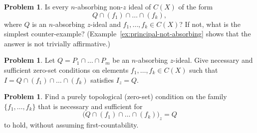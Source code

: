 \documentclass[11pt]{amsart}
\theoremstyle{definition}
\newtheorem{problem}[theorem]{Problem}
\theoremstyle{remark}
\begin{document}
\begin{problem}
\label{prob:classify-gap}
Is every $n$-absorbing non-$z$ ideal of $C(X)$ of the form
\[
Q\cap(f_1)\cap\dots\cap(f_k),
\]
where $Q$ is an $n$-absorbing $z$-ideal and $f_1,\dots,f_k\in C(X)$?
If not, what is the simplest counter-example? (Example~\ref{ex:principal-not-absorbing}
shows that the answer is not trivially affirmative.)
\end{problem}

\begin{problem}
\label{prob:exact-generators}
Let $Q=P_1\cap\dots\cap P_m$ be an $n$-absorbing $z$-ideal. Give
necessary and sufficient zero-set conditions on elements
$f_1,\dots,f_k\in C(X)$ such that
$I=Q\cap(f_1)\cap\dots\cap(f_k)$ satisfies $I_z=Q$.
\end{problem}

\begin{problem}
\label{prob:exact-condition}
Find a purely topological (zero-set) condition on the family
$\{f_1,\dots,f_k\}$ that is necessary and sufficient for
\[
\bigl(Q\cap(f_1)\cap\dots\cap(f_k)\bigr)_z=Q
\]
to hold, without assuming first-countability.
\end{problem}
\end{document}
